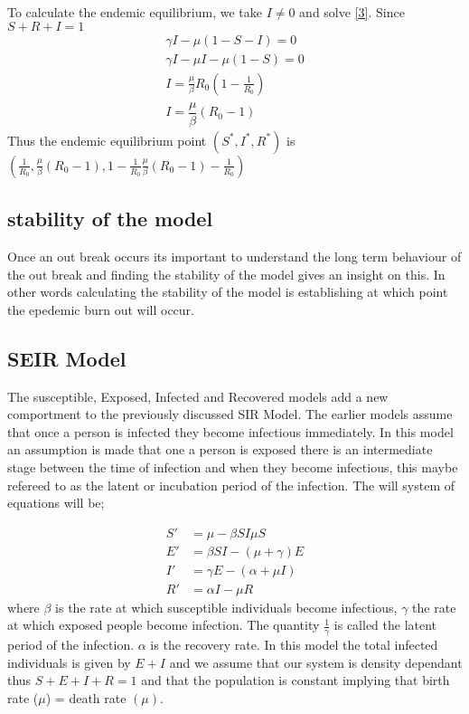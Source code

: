 To calculate the endemic equilibrium, we take $I \neq  0 $ and solve \eqref{3}. Since $S+R+I =1$
 \begin{align}
 \gamma I - \mu (1 -S -I) = 0
 \\ \gamma I - \mu I -\mu (1-S) = 0
 \\ I = \frac{\mu}{\beta} R_0 \left( 1- \frac{1}{R_0} \right)
 \\ I = \dfrac{\mu}{\beta} (R_0 -1) 
 \end{align}
 Thus the endemic equilibrium point $( S^*,I^*,R^*)$ is 
$\left( \frac{1}{R_0}, \frac{\mu}{\beta} (R_0 -1), 1 -  \frac{1}{R_0} \frac{\mu}{\beta} (R_0 -1) - \frac{1}{R_0} \right)$
 \subsection{stability of the model}
 Once an out break occurs its important to understand the long term behaviour of the out break and finding the stability of the model gives an insight on this. In other words calculating the stability of the model is establishing at which point the epedemic burn out will occur.
 \subsection{SEIR Model}
The susceptible, Exposed, Infected and Recovered models add a new comportment to the previously discussed SIR Model. The earlier models assume that once a person is infected they become infectious immediately. In this model an assumption is made that one a person is exposed there is an intermediate stage between the time of infection and when they become infectious, this maybe refereed  to as the latent  or incubation period of the infection.  The will system of equations will be;

\begin{align}
S'& = \mu -\beta S I  \mu S \\
E' &= \beta S I - (\mu + \gamma) E  \\
I' &= \gamma E - (\alpha + \mu I) \\
R' &= \alpha I  - \mu R 
\end{align}
 where $\beta$ is the rate at which susceptible individuals become infectious, $\gamma$ the rate at which exposed people become infection. The quantity $\frac{1}{\gamma}$ is called the latent period of the  infection. $\alpha$ is the recovery rate. In this model the total infected individuals is given by $E +I$ and  we assume that our system is density dependant thus $S + E + I + R = 1$ and  that the population is constant implying that birth rate ($\mu$)  = death rate $(\mu)$.
 
